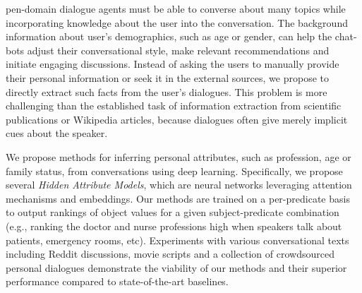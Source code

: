 %
%
pen-domain dialogue agents must be able to converse about many topics while incorporating knowledge about the user into the conversation.
The background information about user's demographics, such as age or gender, can help the chat-bots adjust their conversational style, make relevant recommendations and initiate engaging discussions. Instead of asking the users to manually provide their personal information or seek it in the external sources, we propose to directly extract such facts from the user's dialogues. This problem is more challenging than the established task of 
information extraction from scientific publications or Wikipedia articles, because dialogues
often give merely implicit cues about the speaker.

We propose methods for inferring personal attributes, such as
profession, age or family status, from conversations using deep learning.
Specifically, we propose several
\textit{Hidden Attribute Models}, which are 
neural networks 
leveraging 
attention mechanisms and embeddings. 
Our methods are trained on a per-predicate basis to output
rankings of object values for a given subject-predicate combination
(e.g., ranking the doctor and nurse professions high when speakers talk
about patients, emergency rooms, etc).
Experiments with various conversational texts including Reddit discussions, movie scripts and a collection of crowdsourced personal dialogues
demonstrate the viability of our methods and their superior performance compared
to state-of-the-art baselines.
